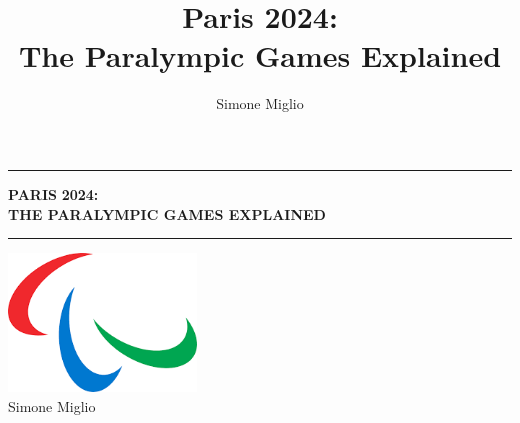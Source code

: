 \documentclass[12pt, oneside]{book}
\title{Paris 2024: \\ 
       The Paralympic Games Explained}
\author{Simone Miglio}
\date{}
\begin{document}
\frontmatter 
\pagestyle{plain} %

\begin{titlepage} 
  \begin{center}
    \vspace*{3cm}
    \hrule height 1pt \vspace{0.4cm}

    {\fontsize{20}{28}\selectfont 
      \textcolor{paralympicRed}{\textbf{PARIS}} \textcolor{paralympicBlue}{\textbf{2024:}} \\ [0.3cm] %
      \textcolor{paralympicGreen}{\textbf{THE PARALYMPIC GAMES EXPLAINED}}
    }

    \vspace{0.4cm}\hrule height 1pt \vspace{2cm} 

    \includegraphics[width=5cm]{Images/logo.png} \vspace{0.5cm} \\
    Simone Miglio
    \vspace{2cm}
  \end{center}
\end{titlepage}

\newpage
 

\tableofcontents

\mainmatter 






\backmatter %

 
 

\nocite{*} 

\printbibliography[heading=bibintoc] %
\end{document}
